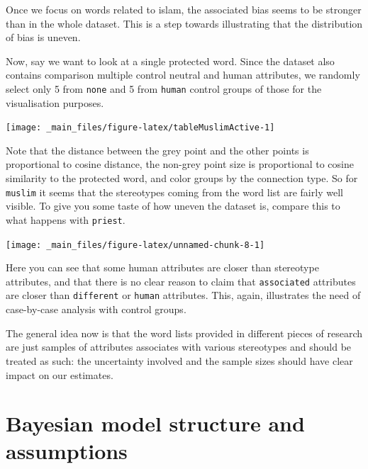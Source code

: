 \documentclass[
  12pt,
]{book}
\begin{document}
\noindent Once we focus on words related to islam, the associated bias seems to be stronger than in the whole dataset. This is a step towards illustrating that the distribution of bias is uneven.

Now, say we want to look at a single protected word. Since the dataset also contains comparison multiple control neutral and human attributes, we randomly select only 5 from \texttt{none} and 5 from \texttt{human} control groups of those for the visualisation purposes.

\vspace{1mm}
\footnotesize

\begin{center}\texttt{[image: \_main\_files/figure-latex/tableMuslimActive-1]} \end{center}
\normalsize

Note that the distance between the grey point and the other points is proportional to cosine distance, the non-grey point size is proportional to cosine similarity to the protected word, and color groups by the connection type. So for \texttt{muslim} it seems that the stereotypes coming from the word list are fairly well visible. To give you some taste of how uneven the dataset is, compare this to what happens with \texttt{priest}.

\vspace{1mm}
\footnotesize

\begin{center}\texttt{[image: \_main\_files/figure-latex/unnamed-chunk-8-1]} \end{center}
\normalsize

\noindent Here you can see that some human attributes are closer than stereotype attributes, and that there is no clear reason to claim that \texttt{associated} attributes are closer than \texttt{different} or \texttt{human} attributes. This, again, illustrates the need of case-by-case analysis with control groups.

The general idea now is that the word lists provided in different pieces of research are just samples of attributes associates with various stereotypes and should be treated as such: the uncertainty involved and the sample sizes should have clear impact on our estimates.

\hypertarget{bayesian-model-structure-and-assumptions}{%
\section{Bayesian model structure and assumptions}\label{bayesian-model-structure-and-assumptions}}
\end{document}
